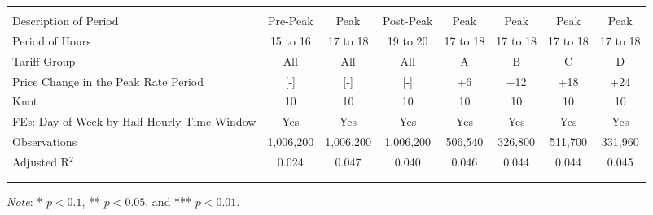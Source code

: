 {\begin{table}[t!]
\begin{adjustbox}{scale = 0.75}
\begin{threeparttable}
\begin{tabular}{@{\extracolsep{10pt}}lccccccc}
                    & & & & & & & \\
                    \hline
                    \\[-2.0ex]
                    Description of Period & Pre-Peak & Peak & Post-Peak & Peak & Peak & Peak & Peak \\
                    Period of Hours & 15 to 16 & 17 to 18 & 19 to 20 & 17 to 18 & 17 to 18 & 17 to 18 & 17 to 18 \\
                    Tariff Group & All & All & All & A & B & C & D \\
                    Price Change in the Peak Rate Period & [-] & [-] & [-] & +6 & +12 & +18 & +24 \\
                    Knot & 10 & 10 & 10 & 10 & 10 & 10 & 10 \\
                    FEs: Day of Week by Half-Hourly Time Window & Yes & Yes & Yes & Yes & Yes & Yes & Yes \\
                    Observations & 1,006,200 & 1,006,200 & 1,006,200 & 506,540 & 326,800 & 511,700 & 331,960 \\
                    Adjusted R$^{2}$ & 0.024 & 0.047 & 0.040 & 0.046 & 0.044 & 0.044 & 0.045 \\
                    \\[-2.0ex]
                    \hline \hline
                    \\[-4.5ex]
                \end{tabular}
                \begin{tablenotes}[flushleft]
                    \footnotesize
                    \item \textit{Note}: * $p < 0.1$, ** $p < 0.05$, and *** $p < 0.01$.
                \end{tablenotes}
            \end{threeparttable}
        \end{adjustbox}
    \end{table}
}
